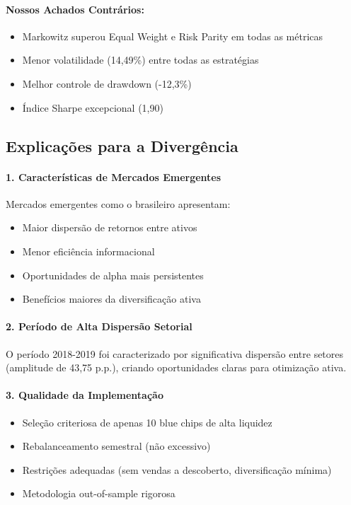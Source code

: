 \paragraph{Nossos Achados Contrários:}
\begin{itemize}
    \item Markowitz superou Equal Weight e Risk Parity em todas as métricas
    \item Menor volatilidade (14,49\%) entre todas as estratégias
    \item Melhor controle de drawdown (-12,3\%)
    \item Índice Sharpe excepcional (1,90)
\end{itemize}

\subsection{Explicações para a Divergência}

\paragraph{1. Características de Mercados Emergentes}
Mercados emergentes como o brasileiro apresentam:
\begin{itemize}
    \item Maior dispersão de retornos entre ativos
    \item Menor eficiência informacional
    \item Oportunidades de alpha mais persistentes
    \item Benefícios maiores da diversificação ativa
\end{itemize}

\paragraph{2. Período de Alta Dispersão Setorial}
O período 2018-2019 foi caracterizado por significativa dispersão entre setores (amplitude de 43,75 p.p.), criando oportunidades claras para otimização ativa.

\paragraph{3. Qualidade da Implementação}
\begin{itemize}
    \item Seleção criteriosa de apenas 10 blue chips de alta liquidez
    \item Rebalanceamento semestral (não excessivo)
    \item Restrições adequadas (sem vendas a descoberto, diversificação mínima)
    \item Metodologia out-of-sample rigorosa
\end{itemize}

